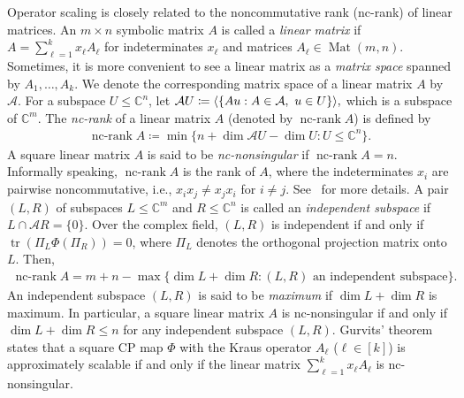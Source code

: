 \documentclass[a4paper,11pt]{article}
\numberwithin{equation}{section}
\newcommand{\C}{\mathbb{C}}
\newcommand{\caA}{\mathcal{A}}
\DeclareMathOperator{\Mat}{Mat}
\DeclareMathOperator{\tr}{tr}
\DeclareMathOperator{\ncrank}{nc-rank}
\DeclarePairedDelimiter{\spnn}{\langle}{\rangle}
\begin{document}
Operator scaling is closely related to the noncommutative rank (nc-rank) of linear matrices.
An $m \times n$ symbolic matrix $A$ is called a \emph{linear matrix} if $A = \sum_{\ell = 1}^k x_\ell A_\ell$ for indeterminates $x_\ell$ and matrices $A_\ell \in \Mat(m, n)$.
Sometimes, it is more convenient to see a linear matrix as a \emph{matrix space} spanned by $A_1, \dots, A_k$.
We denote the corresponding matrix space of a linear matrix $A$ by $\caA$.
For a subspace $U \leq \C^n$, let 
$
    \caA U \coloneqq \spnn{ \{A u : A \in \caA,\ u \in U\} },
    $
which is a subspace of $\C^m$.
The \emph{nc-rank} of a linear matrix $A$ (denoted by $\ncrank A$) is defined by
\begin{align}
    \ncrank A \coloneqq \min\{n + \dim\caA U - \dim U : U \leq \C^n\}.
\end{align}
A square linear matrix $A$ is said to be \emph{nc-nonsingular} if $\ncrank A = n$.
Informally speaking, $\ncrank A$ is the rank of $A$, where the indeterminates $x_i$ are pairwise noncommutative, i.e., $x_i x_j \neq x_j x_i$ for $i \neq j$.
See~\cite{Cohn1995,Fortin2004} for more details.
A pair $(L, R)$ of subspaces $L \leq \C^m$ and $R \leq \C^n$ is called an \emph{independent subspace} if $L \cap \caA R = \{0\}$.
Over the complex field, $(L, R)$ is independent if and only if $\tr(\Pi_L \Phi(\Pi_R)) = 0$, where $\Pi_L$ denotes the orthogonal projection matrix onto $L$.
Then, 
\begin{align}\label{eq:nc-rank-indep}
\ncrank A = m + n  - \max\{\dim L + \dim R : \text{$(L, R)$ an independent subspace}\}.
\end{align}
An independent subspace $(L, R)$ is said to be \emph{maximum} if $\dim L + \dim R$ is maximum.
In particular, a square linear matrix $A$ is nc-nonsingular if and only if $\dim L + \dim R \leq n$ for any independent subspace $(L, R)$.
Gurvits' theorem~\cite{Gurvits2004} states that a square CP map $\Phi$ with the Kraus operator $A_\ell$ ($\ell \in [k]$) is approximately scalable if and only if the linear matrix $\sum_{\ell=1}^k x_\ell A_\ell$ is nc-nonsingular.
\end{document}
